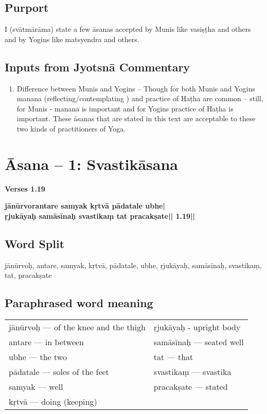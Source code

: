 \subsection*{Purport}

I (svātmārāma) state a few āsanas accepted by Munis like vasiṣṭha and others and by Yogins like matsyendra and others.  

\subsection*{Inputs from Jyotsnā Commentary}

\begin{enumerate}
\item Difference between Munis and Yogins – Though for both Munis and Yogins manana (reflecting/contemplating ) and practice of Haṭha are common – still, for  Munis - manana is important and for Yogins practice of Haṭha is important. These āsanas that are stated in this text are acceptable to these two kinds of practitioners of Yoga.
\end{enumerate}

\section*{Āsana -- 1: Svastikāsana}

\noindent \textbf{Verses 1.19}

\begin{shloka}
\textbf{jānūrvorantare samyak kṛtvā pādatale ubhe|}\\
\textbf{ṛjukāyaḥ samāsīnaḥ svastikaṃ tat pracakṣate|| 1.19||}
\end{shloka}

\subsection*{Word Split}

jānūrvoḥ, antare, samyak, kṛtvā, pādatale, ubhe, ṛjukāyaḥ, samāsīnaḥ, svastikaṃ, tat, pracakṣate
\vspace{-5pt}

\subsection*{Paraphrased word meaning}
\vspace{-10pt}

\begin{longtable}{>{\noindent\raggedright}p{5cm}>{\noindent\raggedright}p{5cm}}
jānūrvoḥ --- of the knee and the thigh & ṛjukāyaḥ - upright body\tabularnewline
antare --- in  between & samāsīnaḥ --- seated well\tabularnewline
ubhe --- the two & tat --- that\tabularnewline
pādatale --- soles of the feet & svastikaṃ --- svastika\tabularnewline
samyak --- well & pracakṣate --- stated\tabularnewline
kṛtvā --- doing (keeping) & 
\end{longtable}
\vspace{-5pt}

